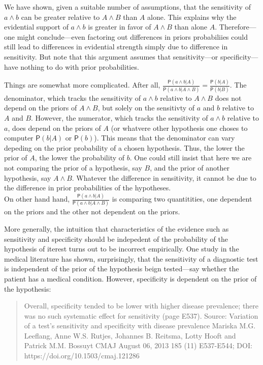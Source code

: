 \documentclass[10pt,dvipsnames,enabledeprecatedfontcommands]{scrartcl}
\newcommand{\pr}[1]{\mathsf{P}(#1)}
\begin{document}
We have shown, given a suitable number of assumptions, that the
sensitivity of \(a\wedge b\) can be greater relative to \(A \wedge B\)
than \(A\) alone. This explains why the evidential support of
\(a\wedge b\) is greater in favor of \(A \wedge B\) than alone \(A\).
Therefore---one might conclude---even factoring out differences in
priors probabiliies could still lead to differences in evidential
strength simply due to difference in sensitivity. But note that this
argument assumes that sensitivity---or specificity---have nothing to do
with prior probabilities.

Things are somewhat more complicated. After all,
\(\frac{\pr{a\wedge b \vert A}}{\pr{a\wedge b \vert A \wedge B}}=\frac{\pr{b \vert A}}{\pr{b \vert B}}\).
The denominator, which tracks the sensitivity of \(a\wedge b\) relative
to \(A\wedge B\) does not depend on the priors of \(A\wedge B\), but
solely on the sensitivty of \(a\) and \(b\) relative to \(A\) and \(B\).
However, the numerator, which tracks the sensitivity of \(a\wedge b\)
relative to \(a\), does depend on the priors of \(A\) (or whatvere other
hypothesis one choses to computer \(\pr{b \vert A}\) or \(\pr{b}\)).
This means that the denominator can vary depeding on the prior
probability of a chosen hypothesis. Thus, the lower the prior of \(A\),
the lower the probability of \(b\). One could still insist that here we
are not comparing the prior of a hypothesis, say \(B\), and the prior of
another hypothesis, say \(A \wedge B\). Whatever the difference in
sensitivity, it cannot be due to the difference in prior probabilities
of the hypotheses.\\
On other hand hand,
\(\frac{\pr{a\wedge b \vert A}}{\pr{a\wedge b \vert A \wedge B}}\) is
comparing two quantitities, one dependent on the priors and the other
not dependent on the priors.

More generally, the intuition that characteristics of the evidence such
as sensitivity and specificity should be indepedent of the probability
of the hypothesis of iterest turns out to be incorrect empirically. One
study in the medical literature has shown, surprisingly, that the
sensitivity of a diagnostic test is independent of the prior of the
hypothesis beign tested---say whether the patient has a medical
condition. However, specificity is dependent on the prior of the
hypothesis:

\begin{quote}
Overall, specificity tended to be
lower with higher disease prevalence; there
was no such systematic effect for sensitivity (page E537).
Source: Variation of a test’s sensitivity and specificity with disease prevalence Mariska M.G. Leeflang, Anne W.S. Rutjes, Johannes B. Reitsma, Lotty Hooft and Patrick M.M. Bossuyt
CMAJ August 06, 2013 185 (11) E537-E544; DOI: https://doi.org/10.1503/cmaj.121286
\end{quote}
\end{document}
